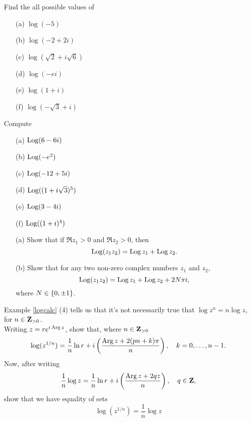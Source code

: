 \begin{problem}\label{prob 9.1}
Find the all possible values of
\begin{multicols}{2}
\begin{itemize}
\item[(a)] $\log(-5)$
\item[(b)] $\log(-2 + 2i)$
\item[(c)] $\log(\sqrt{2} + i\sqrt{6})$
\item[(d)] $\log(-ei)$
\item[(e)] $\log(1 + i)$
\item[(f)] $\log(-\sqrt{3} + i)$
\end{itemize}
\end{multicols}
\end{problem}

\vspace{0.1in}

\begin{problem}\label{prob 9.2}
Compute
\begin{multicols}{2}
\begin{itemize}
\item[(a)] $\operatorname{Log}(6-6i)$
\item[(b)] $\operatorname{Log}(-e^2)$
\item[(c)] $\operatorname{Log}(-12 + 5i)$
\item[(d)] $\operatorname{Log}((1 + i\sqrt{3})^5)$
\item[(e)] $\operatorname{Log}(3 - 4i)$
\item[(f)] $\operatorname{Log}((1+i)^4)$
\end{itemize}
\end{multicols}
\end{problem}

\vspace{0.1in}

\begin{problem}\label{prob 9.3}\hfill
\begin{itemize}
\item[(a)] Show that if $\Re z_1 > 0$ and $\Re z_2 > 0$, then
\[\operatorname{Log}(z_1z_2) = \operatorname{Log} z_1 + \operatorname{Log} z_2.\]
\item[(b)] Show that for any two non-zero complex numbers $z_1$ and $z_2$,
\[\operatorname{Log}(z_1z_2) = \operatorname{Log} z_1 + \operatorname{Log} z_2 + 2N\pi i,\]
where $N \in \left\{0,\pm 1\right\}$.
\end{itemize}
\end{problem}

\vspace{0.1in}

\begin{problem}\label{prob 9.4}
Example \ref{logcalc} (4) tells us that it's not necessarily true that $\log z^n = n\log z$, for $n \in \mathbf Z_{>0}$.\\[0.5em]
Writing $z = re^{i\operatorname{Arg} z}$, show that, where $n \in \mathbf Z_{>0}$
\[\log(z^{1/n}) = \frac{1}{n}\ln r + i\left(\frac{\operatorname{Arg} z + 2(pn + k)\pi}{n}\right),\quad k = 0,\ldots,n-1.\]
Now, after writing 
\[\frac{1}{n}\log z = \frac{1}{n}\ln r + i\left(\frac{\operatorname{Arg} z + 2qz}{n}\right),\quad q \in \mathbf Z,\]
show that we have equality of sets
\[\log(z^{1/n}) = \frac{1}{n}\log z\]
\end{problem}

